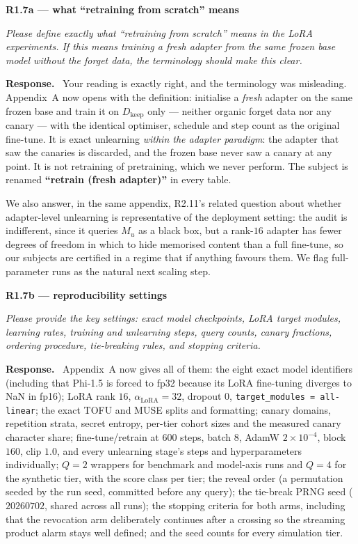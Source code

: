 \documentclass[11pt,a4paper]{article}
\newenvironment{point}[1]{%
  \par\medskip\noindent\textbf{\color{rcol}#1}\par\nopagebreak\smallskip\begingroup
  \color{rcol}\itshape}{\endgroup\par}
\newenvironment{reply}{%
  \par\smallskip\noindent\textbf{\color{acol}Response.}\ \begingroup}{\endgroup\par}
\begin{document}
\begin{point}{R1.7a --- what ``retraining from scratch'' means}
Please define exactly what ``retraining from scratch'' means in the LoRA experiments.
If this means training a fresh adapter from the same frozen base model without the
forget data, the terminology should make this clear.
\end{point}

\begin{reply}
Your reading is exactly right, and the terminology was misleading. Appendix~A now opens
with the definition: initialise a \emph{fresh} adapter on the same frozen base and
train it on $D_{\mathrm{keep}}$ only --- neither organic forget data nor any canary ---
with the identical optimiser, schedule and step count as the original fine-tune. It is
exact unlearning \emph{within the adapter paradigm}: the adapter that saw the canaries
is discarded, and the frozen base never saw a canary at any point. It is not retraining
of pretraining, which we never perform. The subject is renamed
\textbf{``retrain (fresh adapter)''} in every table.

We also answer, in the same appendix, R2.11's related question about whether
adapter-level unlearning is representative of the deployment setting: the audit is
indifferent, since it queries $M_u$ as a black box, but a rank-$16$ adapter has fewer
degrees of freedom in which to hide memorised content than a full fine-tune, so our
subjects are certified in a regime that if anything favours them. We flag full-parameter
runs as the natural next scaling step.
\end{reply}

\begin{point}{R1.7b --- reproducibility settings}
Please provide the key settings: exact model checkpoints, LoRA target modules, learning
rates, training and unlearning steps, query counts, canary fractions, ordering
procedure, tie-breaking rules, and stopping criteria.
\end{point}

\begin{reply}
Appendix~A now gives all of them: the eight exact model identifiers (including that
Phi-1.5 is forced to fp32 because its LoRA fine-tuning diverges to NaN in fp16); LoRA
rank $16$, $\alpha_{\mathrm{LoRA}}=32$, dropout $0$, \texttt{target\_modules =
all-linear}; the exact TOFU and MUSE splits and formatting; canary domains, repetition
strata, secret entropy, per-tier cohort sizes and the measured canary character share;
fine-tune/retrain at $600$ steps, batch $8$, AdamW $2\times10^{-4}$, block $160$, clip
$1.0$, and every unlearning stage's steps and hyperparameters individually; $Q=2$
wrappers for benchmark and model-axis runs and $Q=4$ for the synthetic tier, with the
score class per tier; the reveal order (a permutation seeded by the run seed, committed
before any query); the tie-break PRNG seed ($20260702$, shared across all runs); the
stopping criteria for both arms, including that the revocation arm deliberately
continues after a crossing so the streaming product alarm stays well defined; and the
seed counts for every simulation tier.
\end{reply}
\end{document}
